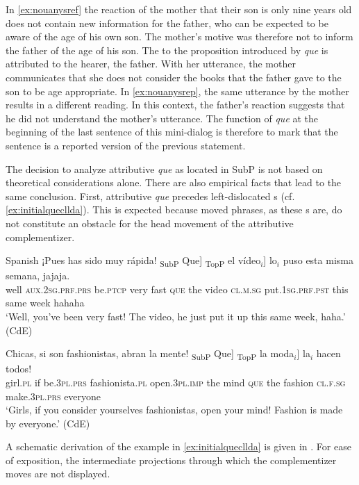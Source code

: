 In \eqref{ex:nouanysref} the reaction of the mother that their son is only nine years old does not contain new information for the father, who can be expected to be aware of the age of his own son. The mother's motive was therefore not to inform the father of the age of his son. The  to the proposition introduced by \emph{que} is attributed to the hearer, the father. With her utterance, the mother  communicates that she does not consider  the books that the father gave to the son to be age appropriate.
In \eqref{ex:nouanysrep}, the same utterance by the mother results in a different reading. In this context, the father's reaction suggests that he did not understand the mother's utterance. The function of \emph{que} at the beginning of the last sentence of this mini-dialog is therefore to mark that the sentence is a reported version of the previous statement.  

The decision to analyze attributive \emph{que} as located in SubP is not  based on theoretical considerations alone. There are also  empirical facts that lead to the same conclusion. First, attributive \emph{que} precedes  left-dislocated s (cf. \ref{ex:initialquecllda}). This is expected because moved phrases, as these s are, do not constitute an obstacle for the head movement of the attributive complementizer.

\ea\label{ex:initialqueclld}Spanish
\ea\label{ex:initialquecllda}
\gll ¡Pues has sido muy rápida! {\ob}\textsubscript{SubP} Que] {\ob}\textsubscript{TopP} el vídeo$_i$] lo$_i$ puso esta misma semana, jajaja. \\
		well \textsc{aux.2sg.prf.prs} be.\textsc{ptcp} very fast {} \textsc{que} {} the video \textsc{cl.m.sg} put.\textsc{1sg.prf.pst} this same week hahaha\\
		\glt `Well, you've been very fast! The video, he just put it up this same week, haha.' (CdE)
		\ex 

		\gll Chicas, si son fashionistas, abran la mente! {\ob}\textsubscript{SubP} Que] {\ob}\textsubscript{TopP} la moda$_i$] la$_i$ hacen todos! \\
		girl.\textsc{pl} if be.\textsc{3pl.prs} fashionista.\textsc{pl} open.\textsc{3pl.imp} the mind {} \textsc{que} {} the fashion \textsc{cl.f.sg} make.\textsc{3pl.prs} everyone\\
		\glt `Girls, if you consider yourselves  fashionistas, open your mind! Fashion is made by everyone.' (CdE)
	\z
\z	


A schematic derivation of the example in \eqref{ex:initialquecllda} is given in . For ease of exposition, the intermediate projections through which the complementizer moves are not displayed.

